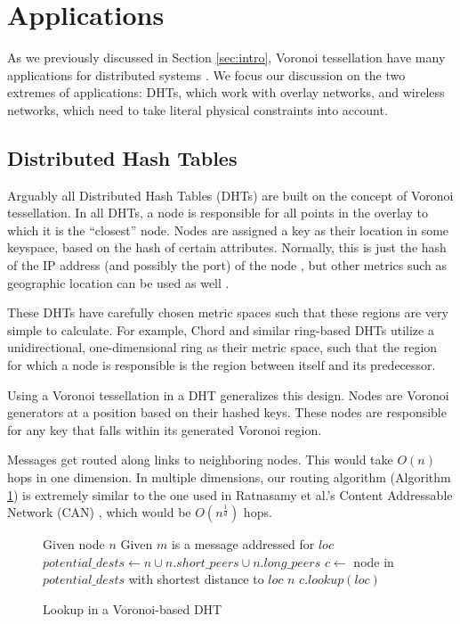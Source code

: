 \section{Applications}
\label{sec:applications}

As we previously discussed in Section \ref{sec:intro}, Voronoi tessellation have many applications for distributed systems \cite{carbunar2004distributed} \cite{hu2004scalable} \cite{hu2008voronoi} \cite{Backhaus:2007:VAS:1326257.1326266}.
We focus our discussion on the two extremes of applications: DHTs, which work with overlay networks, and wireless networks, which need to take literal physical constraints into account.




\subsection{Distributed Hash Tables}
Arguably all Distributed Hash Tables (DHTs) are built on the concept of Voronoi tessellation.
In all DHTs, a node is responsible for all points in the overlay to which it is the ``closest'' node.
Nodes are assigned a key as their location in some keyspace, based on the hash of certain attributes.
Normally, this is just the hash of the IP address (and possibly the port) of the node \cite{chord} \cite{kademlia} \cite{can} \cite{pastry}, but other metrics such as geographic location can be used as well \cite{ratnasamy2002ght}.

These DHTs have carefully chosen metric spaces such that these regions are very simple to calculate.
For example, Chord \cite{chord} and similar ring-based DHTs \cite{manku2003symphony} utilize a unidirectional, one-dimensional ring as their metric space, such that the region for which a node is responsible is the region between itself and its predecessor.

Using a Voronoi tessellation in a DHT generalizes this design. 
Nodes are Voronoi generators at a position based on their hashed keys.
These nodes are responsible for any key that falls within its generated Voronoi region.

Messages get routed along links to neighboring nodes. 
This would take $O(n)$ hops in one dimension.
In multiple dimensions, our routing algorithm (Algorithm \ref{alg:lookup}) is extremely similar to the one used in Ratnasamy et al.'s Content Addressable Network (CAN) \cite{can}, which would be $O(n^{\frac{1}{d}})$ hops.
\begin{figure}
	\caption{Lookup in a Voronoi-based DHT}
	\label{alg:lookup}
	\begin{algorithmic}[1] 
		\State Given node $n$
		\State Given $m$ is a message addressed for $loc$
		\State $potential\_dests \leftarrow n \cup n.short\_peers \cup n.long\_peers$
		\State $c \leftarrow $ node in $ potential\_dests$ with shortest distance to $loc$
		\Return $n$
		\Else
		\Return $c.lookup(loc)$
		\EndIf
	\end{algorithmic}
\end{figure}


